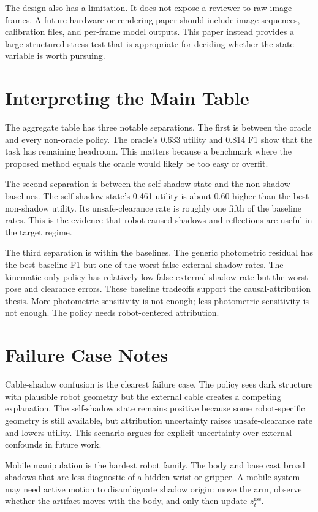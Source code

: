 \documentclass{article}
\newcommand{\rss}{z^{\mathrm{rss}}}
\begin{document}
The design also has a limitation. It does not expose a reviewer to raw image frames. A future hardware or rendering paper should include image sequences, calibration files, and per-frame model outputs. This paper instead provides a large structured stress test that is appropriate for deciding whether the state variable is worth pursuing.

\section{Interpreting the Main Table}

The aggregate table has three notable separations. The first is between the oracle and every non-oracle policy. The oracle's 0.633 utility and 0.814 F1 show that the task has remaining headroom. This matters because a benchmark where the proposed method equals the oracle would likely be too easy or overfit.

The second separation is between the self-shadow state and the non-shadow baselines. The self-shadow state's 0.461 utility is about 0.60 higher than the best non-shadow utility. Its unsafe-clearance rate is roughly one fifth of the baseline rates. This is the evidence that robot-caused shadows and reflections are useful in the target regime.

The third separation is within the baselines. The generic photometric residual has the best baseline F1 but one of the worst false external-shadow rates. The kinematic-only policy has relatively low false external-shadow rate but the worst pose and clearance errors. These baseline tradeoffs support the causal-attribution thesis. More photometric sensitivity is not enough; less photometric sensitivity is not enough. The policy needs robot-centered attribution.

\section{Failure Case Notes}

Cable-shadow confusion is the clearest failure case. The policy sees dark structure with plausible robot geometry but the external cable creates a competing explanation. The self-shadow state remains positive because some robot-specific geometry is still available, but attribution uncertainty raises unsafe-clearance rate and lowers utility. This scenario argues for explicit uncertainty over external confounds in future work.

Mobile manipulation is the hardest robot family. The body and base cast broad shadows that are less diagnostic of a hidden wrist or gripper. A mobile system may need active motion to disambiguate shadow origin: move the arm, observe whether the artifact moves with the body, and only then update $\rss_t$.
\end{document}
